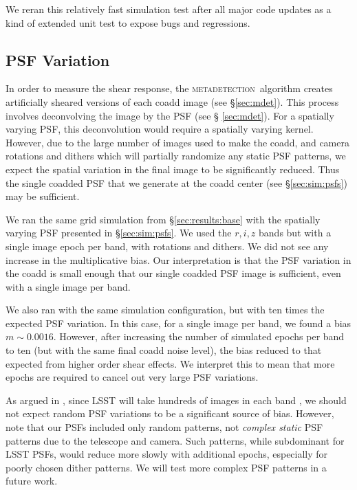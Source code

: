 \documentclass[twocolumn,twocolappendix,astrosym]{openjournal}
\newcommand{\mdet}{\textsc{metadetection}}
\begin{document}
We reran this relatively fast simulation test after all major code updates as a
kind of extended unit test to expose bugs and regressions.

\subsection{PSF Variation} \label{sec:results:psfvar}

In order to measure the shear response, the \mdet\ algorithm creates
artificially sheared versions of each coadd image (see \S \ref{sec:mdet}).
This process involves deconvolving the image by the PSF (see \S
\ref{sec:mdet}).  For a spatially varying PSF, this deconvolution would require a
spatially varying kernel.  However, due to the large number of images used to
make the coadd, and camera rotations and dithers which will partially randomize
any static PSF patterns, we expect the spatial variation in the final image
to be significantly reduced.  Thus the single coadded PSF that we generate at
the coadd center (see \S \ref{sec:sim:psfs}) may be sufficient.

We ran the same grid simulation from \S \ref{sec:results:base} with the
spatially varying PSF presented in \S \ref{sec:sim:psfs}. We used the $r, i, z$
bands but with a single image epoch per band, with rotations and dithers.  We
did not see any increase in the multiplicative bias.   Our interpretation is
that the PSF variation in the coadd is small enough that our single coadded PSF
image is sufficient, even with a single image per band.

We also ran with the same simulation configuration, but with ten times the
expected PSF variation. In this case, for a single image per band, we found a
bias $m \sim 0.0016$.  However, after increasing the number of simulated epochs
per band to ten (but with the same final coadd noise level), the bias
reduced to that expected from higher order shear effects.  We interpret
this to mean that more epochs are required to cancel out very large PSF
variations.

As argued in \citet{mdet20}, since LSST will take hundreds of images in each band \citep{IvezicLSST2008}, we
should not expect random PSF variations to be a significant source of bias.
However, note that our PSFs included only random patterns, not {\em complex
static} PSF patterns due to the telescope and camera. Such patterns, while
subdominant for LSST PSFs, would reduce more slowly with additional epochs,
especially for poorly chosen dither patterns. We will test more complex PSF
patterns in a future work.
\end{document}
